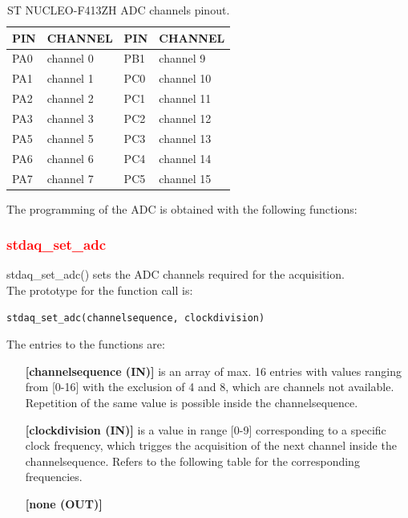 \documentclass[letterpaper,10pt,english]{hitec}
\begin{document}
\begin{table}[h]
\caption{ST NUCLEO-F413ZH ADC channels pinout.}
\centering
\begin{tabular}{|ll|ll|}
 \textbf{PIN} & \textbf{CHANNEL} & \textbf{PIN} & \textbf{CHANNEL} \\ \hline
 PA0 & channel 0 & PB1 & channel 9 \\
 PA1 & channel 1 & PC0 & channel 10 \\
 PA2 & channel 2 & PC1 & channel 11 \\
 PA3 & channel 3 & PC2 & channel 12 \\
 PA5 & channel 5 & PC3 & channel 13 \\
 PA6 & channel 6 & PC4 & channel 14 \\
 PA7 & channel 7 & PC5 & channel 15 
\end{tabular}
\end{table}
The programming of the ADC is obtained with the following functions:

\subsubsection{\textcolor{red}{stdaq\_set\_adc}}

stdaq\_set\_adc() sets the ADC channels required for the acquisition. \\
The prototype for the function call is: 
\begin{verbatim}
stdaq_set_adc(channelsequence, clockdivision)
\end{verbatim}
The entries to the functions are:
\begin{itemize}
\item [\textbf{[channelsequence (IN)]}] is an array of max. 16 entries with values ranging from [0-16] with the exclusion of 4 and 8, which are channels not available. Repetition of the same value is possible inside the channelsequence.
\item [\textbf{[clockdivision (IN)]}] is a value in range [0-9] corresponding to a specific clock frequency, which trigges the acquisition of the next channel inside the channelsequence. Refers to the following table for the corresponding frequencies.
\item [\textbf{[none (OUT)]}]
\end{itemize}
\end{document}
